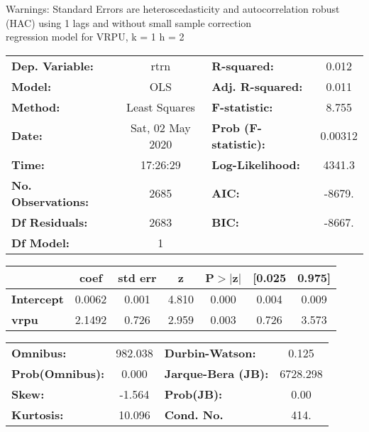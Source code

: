 Warnings: \newline
 [1] Standard Errors are heteroscedasticity and autocorrelation robust (HAC) using 1 lags and without small sample correction\\ 

regression model for VRPU, k = 1 h = 2\begin{center}
\begin{tabular}{lclc}
\toprule
\textbf{Dep. Variable:}    &       rtrn       & \textbf{  R-squared:         } &     0.012   \\
\textbf{Model:}            &       OLS        & \textbf{  Adj. R-squared:    } &     0.011   \\
\textbf{Method:}           &  Least Squares   & \textbf{  F-statistic:       } &     8.755   \\
\textbf{Date:}             & Sat, 02 May 2020 & \textbf{  Prob (F-statistic):} &  0.00312    \\
\textbf{Time:}             &     17:26:29     & \textbf{  Log-Likelihood:    } &    4341.3   \\
\textbf{No. Observations:} &        2685      & \textbf{  AIC:               } &    -8679.   \\
\textbf{Df Residuals:}     &        2683      & \textbf{  BIC:               } &    -8667.   \\
\textbf{Df Model:}         &           1      & \textbf{                     } &             \\
\bottomrule
\end{tabular}
\begin{tabular}{lcccccc}
                   & \textbf{coef} & \textbf{std err} & \textbf{z} & \textbf{P$> |$z$|$} & \textbf{[0.025} & \textbf{0.975]}  \\
\midrule
\textbf{Intercept} &       0.0062  &        0.001     &     4.810  &         0.000        &        0.004    &        0.009     \\
\textbf{vrpu}      &       2.1492  &        0.726     &     2.959  &         0.003        &        0.726    &        3.573     \\
\bottomrule
\end{tabular}
\begin{tabular}{lclc}
\textbf{Omnibus:}       & 982.038 & \textbf{  Durbin-Watson:     } &    0.125  \\
\textbf{Prob(Omnibus):} &   0.000 & \textbf{  Jarque-Bera (JB):  } & 6728.298  \\
\textbf{Skew:}          &  -1.564 & \textbf{  Prob(JB):          } &     0.00  \\
\textbf{Kurtosis:}      &  10.096 & \textbf{  Cond. No.          } &     414.  \\
\bottomrule
\end{tabular}
\end{center}

